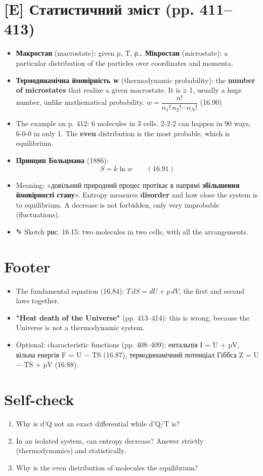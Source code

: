 \documentclass[11pt,a4paper,oneside]{book}
\newcommand{\pen}{{\sffamily\color{accent}✎}}
\begin{document}
\section*{[E] Статистичний зміст (pp. 411–413)}
\begin{itemize}
\item \textbf{Макростан} (macrostate): given p, T, ρ… \textbf{Мікростан} (microstate): a particular distribution of the particles over coordinates and momenta.
\item \textbf{Термодинамічна ймовірність w} (thermodynamic probability): the \textbf{number of microstates} that realize a given macrostate. It is ≥ 1, usually a huge number, unlike mathematical probability. $w = \dfrac{n!}{n_1!\,n_2!\cdots n_N!}$ (16.90)
\item The example on p. 412: 6 molecules in 3 cells. 2-2-2 can happen in 90 ways, 6-0-0 in only 1. The \textbf{even} distribution is the most probable, which is equilibrium.
\item \textbf{Принцип Больцмана} (1886):
\[S = k\ln w\qquad(16.91)\]
\item Meaning: «довільний природний процес протікає в напрямі \textbf{збільшення ймовірності стану}». Entropy measures \textbf{disorder} and how close the system is to equilibrium. A decrease is not forbidden, only very improbable (fluctuations).
\item \pen{} Sketch рис. 16.15: two molecules in two cells, with all the arrangements.
\end{itemize}

\section*{Footer}
\begin{itemize}
\item The fundamental equation (16.84): $T\,dS = dU + p\,dV$, the first and second laws together.
\item \textbf{"Heat death of the Universe"} (pp. 413–414): this is wrong, because the Universe is not a thermodynamic system.
\item Optional: characteristic functions (pp. 408–409): ентальпія I = U + pV, вільна енергія F = U − TS (16.87), термодинамічний потенціал Гіббса Z = U − TS + pV (16.88).
\end{itemize}

\section*{Self-check}
\begin{enumerate}
\item Why is d'Q not an exact differential while d'Q/T is?
\item In an isolated system, can entropy decrease? Answer strictly (thermodynamics) and statistically.
\item Why is the even distribution of molecules the equilibrium?
\end{enumerate}
\end{document}
